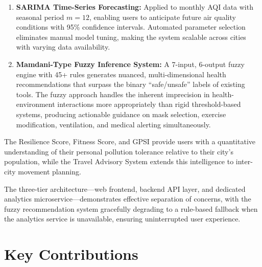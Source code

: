 \documentclass[12pt,a4paper]{report}
\begin{document}
\begin{enumerate}[leftmargin=*]
  \item \textbf{SARIMA Time-Series Forecasting:} Applied to monthly AQI data with seasonal period $m=12$, enabling users to anticipate future air quality conditions with 95\% confidence intervals. Automated parameter selection eliminates manual model tuning, making the system scalable across cities with varying data availability.

  \item \textbf{Mamdani-Type Fuzzy Inference System:} A 7-input, 6-output fuzzy engine with 45+ rules generates nuanced, multi-dimensional health recommendations that surpass the binary ``safe/unsafe'' labels of existing tools. The fuzzy approach handles the inherent imprecision in health-environment interactions more appropriately than rigid threshold-based systems, producing actionable guidance on mask selection, exercise modification, ventilation, and medical alerting simultaneously.
\end{enumerate}

The Resilience Score, Fitness Score, and GPSI provide users with a quantitative understanding of their personal pollution tolerance relative to their city's population, while the Travel Advisory System extends this intelligence to inter-city movement planning.

The three-tier architecture---web frontend, backend API layer, and dedicated analytics microservice---demonstrates effective separation of concerns, with the fuzzy recommendation system gracefully degrading to a rule-based fallback when the analytics service is unavailable, ensuring uninterrupted user experience.

\section{Key Contributions}
\end{document}
